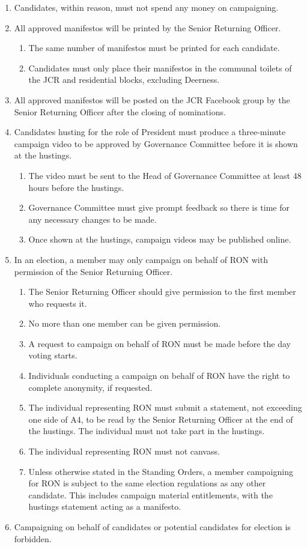 \documentclass[12pt]{article}
\begin{document}
\begin{enumerate}
\begin{enumerate}
    \end{enumerate}
    \item Candidates, within reason, must not spend any money on campaigning.
    \item All approved manifestos will be printed by the Senior Returning Officer.
    \begin{enumerate}
        \item The same number of manifestos must be printed for each candidate.
        \item Candidates must only place their manifestos in the communal toilets of the JCR and residential blocks, excluding Deerness.
    \end{enumerate}
    \item All approved manifestos will be posted on the JCR Facebook group by the Senior Returning Officer after the closing of nominations.
    \item Candidates husting for the role of President must produce a three-minute campaign video to be approved by Governance Committee before it is shown at the hustings.
    \begin{enumerate}
        \item The video must be sent to the Head of Governance Committee at least 48 hours before the hustings.
        \item Governance Committee must give prompt feedback so there is time for any necessary changes to be made.
        \item Once shown at the hustings, campaign videos may be published online.
    \end{enumerate}
    \item In an election, a member may only campaign on behalf of RON with permission of the Senior Returning Officer.
    \begin{enumerate}
        \item The Senior Returning Officer should give permission to the first member who requests it.
        \item No more than one member can be given permission.
        \item A request to campaign on behalf of RON must be made before the day voting starts.
        \item Individuals conducting a campaign on behalf of RON have the right to complete anonymity, if requested.
        \item The individual representing RON must submit a statement, not exceeding one side of A4, to be read by the Senior Returning Officer at the end of the hustings. The individual must not take part in the hustings.
        \item The individual representing RON must not canvass.
        \item Unless otherwise stated in the Standing Orders, a member campaigning for RON is subject to the same election regulations as any other candidate. This includes campaign material entitlements, with the hustings statement acting as a manifesto.
    \end{enumerate}
    \item Campaigning on behalf of candidates or potential candidates for election is forbidden.
\end{enumerate}
\end{document}
